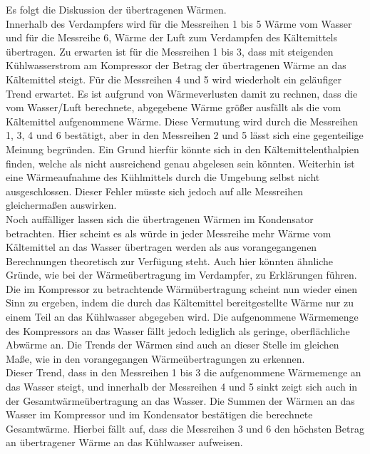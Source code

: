 Es folgt die Diskussion der übertragenen Wärmen.\\
Innerhalb des Verdampfers wird für die Messreihen 1 bis 5 Wärme vom Wasser und für die Messreihe 6, Wärme der Luft zum Verdampfen des Kältemittels übertragen. Zu erwarten ist für die Messreihen 1 bis 3, dass mit steigenden Kühlwasserstrom am Kompressor der Betrag der übertragenen Wärme an das Kältemittel steigt. Für die Messreihen 4 und 5 wird wiederholt ein geläufiger Trend erwartet. Es ist aufgrund von Wärmeverlusten damit zu rechnen, dass die vom Wasser/Luft berechnete, abgegebene Wärme größer ausfällt als die vom Kältemittel aufgenommene Wärme. Diese Vermutung wird durch die Messreihen 1, 3, 4 und 6 bestätigt, aber in den Messreihen 2 und 5 lässt sich eine gegenteilige Meinung begründen. Ein Grund hierfür könnte sich in den Kältemittelenthalpien finden, welche als nicht ausreichend genau abgelesen sein könnten. Weiterhin ist eine Wärmeaufnahme des Kühlmittels durch die Umgebung selbst nicht ausgeschlossen. Dieser Fehler müsste sich jedoch auf alle Messreihen gleichermaßen auswirken.\\
Noch auffälliger lassen sich die übertragenen Wärmen im Kondensator betrachten. Hier scheint es als würde in jeder Messreihe mehr Wärme vom Kältemittel an das Wasser übertragen werden als aus vorangegangenen Berechnungen theoretisch zur Verfügung steht. Auch hier könnten ähnliche Gründe, wie bei der Wärmeübertragung im Verdampfer, zu Erklärungen führen.\\

Die im Kompressor zu betrachtende Wärmübertragung scheint nun wieder einen Sinn zu ergeben, indem die durch das Kältemittel bereitgestellte Wärme nur zu einem Teil an das Kühlwasser abgegeben wird. Die aufgenommene Wärmemenge des Kompressors an das Wasser fällt jedoch lediglich als geringe, oberflächliche Abwärme an. Die Trends der Wärmen sind auch an dieser Stelle im gleichen Maße, wie in den vorangegangen Wärmeübertragungen zu erkennen.\\

Dieser Trend, dass in den Messreihen 1 bis 3 die aufgenommene Wärmemenge an das Wasser steigt, und innerhalb der Messreihen 4 und 5 sinkt zeigt sich auch in der Gesamtwärmeübertragung an das Wasser. Die Summen der Wärmen an das Wasser im Kompressor und im Kondensator bestätigen die berechnete Gesamtwärme. Hierbei fällt auf, dass die Messreihen 3 und 6 den höchsten Betrag  an übertragener Wärme an das Kühlwasser aufweisen.\\

